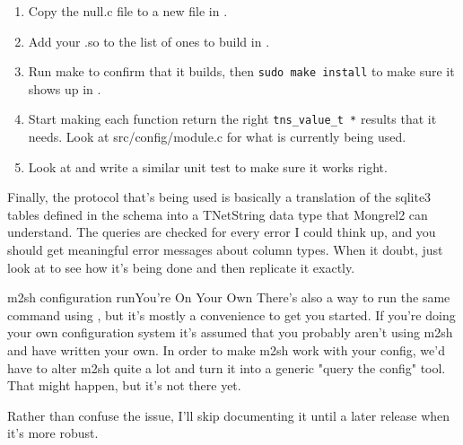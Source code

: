 \begin{enumerate}
\item Copy the null.c file to a new file in .
\item Add your .so to the list of ones to build in .
\item Run make to confirm that it builds, then \verb|sudo make install| to make sure it shows up in .
\item Start making each function return the right \verb|tns_value_t *| results that
it needs.  Look at src/config/module.c for what is currently being used.
\item Look at  and write a similar unit test to make sure it works right.
\end{enumerate}

Finally, the protocol that's being used is basically a translation of the sqlite3 tables
defined in the  schema into a TNetString data type that
Mongrel2 can understand.  The queries are checked for every error I could think up, and
you should get meaningful error messages about column types.  When it doubt, just
look at  to see how it's being done and then replicate it exactly.

\begin{aside}{m2sh configuration run}{You're On Your Own}
There's also a way to run the same command using , but it's
mostly a convenience to get you started.  If you're doing your own
configuration system it's assumed that you probably aren't using
m2sh and have written your own.  In order to make m2sh work with your
config, we'd have to alter m2sh quite a lot and turn it into a generic
"query the config" tool.  That might happen, but it's not there yet.

Rather than confuse the issue, I'll skip documenting it until a later
release when it's more robust.
\end{aside}

